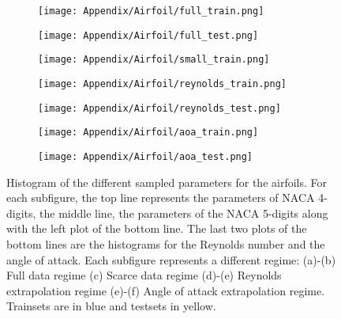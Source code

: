 \begin{subappendices}
	\begin{figure}
		\centering
		\begin{subfigure}{0.32\textwidth}
			\centering
			\texttt{[image: Appendix/Airfoil/full\_train.png]}
			\caption{}
		\end{subfigure}
		\begin{subfigure}{0.32\textwidth}
			\centering
			\texttt{[image: Appendix/Airfoil/full\_test.png]}
			\caption{}
		\end{subfigure}
		\begin{subfigure}{0.32\textwidth}
			\centering
			\texttt{[image: Appendix/Airfoil/small\_train.png]}
			\caption{}
		\end{subfigure}
		
		\begin{subfigure}{0.32\textwidth}
			\centering
			\texttt{[image: Appendix/Airfoil/reynolds\_train.png]}
			\caption{}
		\end{subfigure}
		\begin{subfigure}{0.32\textwidth}
			\centering
			\texttt{[image: Appendix/Airfoil/reynolds\_test.png]}
			\caption{}
		\end{subfigure}
		
		\begin{subfigure}{0.32\textwidth}
			\centering
			\texttt{[image: Appendix/Airfoil/aoa\_train.png]}
			\caption{}
		\end{subfigure}
		\begin{subfigure}{0.32\textwidth}
			\centering
			\texttt{[image: Appendix/Airfoil/aoa\_test.png]}
			\caption{}
		\end{subfigure}
		\caption{Histogram of the different sampled parameters for the airfoils. For each subfigure, the top line represents the parameters of NACA 4-digits, the middle line, the parameters of the NACA 5-digits along with the left plot of the bottom line. The last two plots of the bottom lines are the histograms for the Reynolds number and the angle of attack. Each subfigure represents a different regime: (a)-(b) Full data regime (c) Scarce data regime (d)-(e) Reynolds extrapolation regime (e)-(f) Angle of attack extrapolation regime. Trainsets are in blue and testsets in yellow.}
		\label{fig:naca_stats}
	\end{figure}


\end{subappendices}
